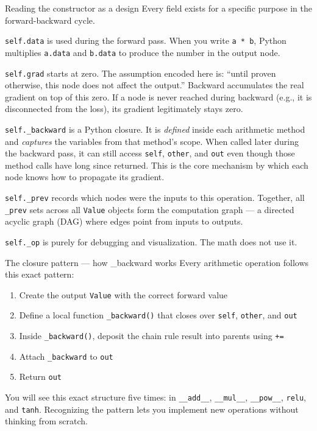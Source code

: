\documentclass[12pt,a4paper]{article}
\newcommand{\code}[1]{\texttt{\small\color{deepblue}#1}}
\begin{document}
\begin{codeexplainbox}{Reading the constructor as a design}
Every field exists for a specific purpose in the forward-backward cycle.

\code{self.data} is used during the forward pass. When you write \code{a * b}, Python multiplies \code{a.data} and \code{b.data} to produce the number in the output node.

\code{self.grad} starts at zero. The assumption encoded here is: ``until proven otherwise, this node does not affect the output.'' Backward accumulates the real gradient on top of this zero. If a node is never reached during backward (e.g., it is disconnected from the loss), its gradient legitimately stays zero.

\code{self.\_backward} is a Python closure. It is \emph{defined} inside each arithmetic method and \emph{captures} the variables from that method's scope. When called later during the backward pass, it can still access \code{self}, \code{other}, and \code{out} even though those method calls have long since returned. This is the core mechanism by which each node knows how to propagate its gradient.

\code{self.\_prev} records which nodes were the inputs to this operation. Together, all \code{\_prev} sets across all \code{Value} objects form the computation graph — a directed acyclic graph (DAG) where edges point from inputs to outputs.

\code{self.\_op} is purely for debugging and visualization. The math does not use it.
\end{codeexplainbox}

\begin{patternbox}{The closure pattern — how \_backward works}
Every arithmetic operation follows this exact pattern:
\begin{enumerate}
  \item Create the output \code{Value} with the correct forward value
  \item Define a local function \code{\_backward()} that closes over \code{self}, \code{other}, and \code{out}
  \item Inside \code{\_backward()}, deposit the chain rule result into parents using \code{+=}
  \item Attach \code{\_backward} to \code{out}
  \item Return \code{out}
\end{enumerate}
You will see this exact structure five times: in \code{\_\_add\_\_}, \code{\_\_mul\_\_}, \code{\_\_pow\_\_}, \code{relu}, and \code{tanh}. Recognizing the pattern lets you implement new operations without thinking from scratch.
\end{patternbox}
\end{document}
